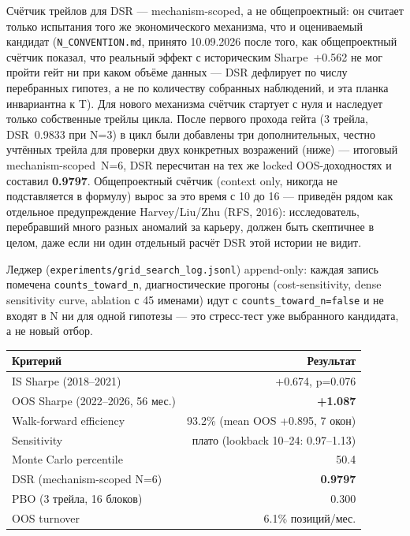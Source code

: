 \documentclass[11pt,a4paper]{article}
\newcommand{\repsection}[1]{\vspace{1.1em}\noindent{\headfont\Large\bfseries\color{accent}#1}\vspace{0.35em}\par}
\newcommand{\repsub}[1]{\vspace{0.7em}\noindent{\headfont\large\bfseries\color{accent}#1}\vspace{0.2em}\par}
\begin{document}
Счётчик трейлов для DSR --- mechanism-scoped, а не общепроектный: он считает только испытания того же экономического механизма, что и оцениваемый кандидат (\texttt{N\_CONVENTION.md}, принято 10.09.2026 после того, как общепроектный счётчик показал, что реальный эффект с историческим Sharpe~+0.562 не мог пройти гейт ни при каком объёме данных --- DSR дефлирует по числу перебранных гипотез, а не по количеству собранных наблюдений, и эта планка инвариантна к T). Для нового механизма счётчик стартует с нуля и наследует только собственные трейлы цикла. После первого прохода гейта (3 трейла, DSR~0.9833 при N=3) в цикл были добавлены три дополнительных, честно учтённых трейла для проверки двух конкретных возражений (ниже) --- итоговый mechanism-scoped~N=6, DSR пересчитан на тех же locked OOS-доходностях и составил \textbf{0.9797}. Общепроектный счётчик (context only, никогда не подставляется в формулу) вырос за это время с 10 до 16 --- приведён рядом как отдельное предупреждение Harvey/Liu/Zhu (RFS, 2016): исследователь, перебравший много разных аномалий за карьеру, должен быть скептичнее в целом, даже если ни один отдельный расчёт DSR этой истории не видит.

Леджер (\texttt{experiments/grid\_search\_log.jsonl}) append-only: каждая запись помечена \texttt{counts\_toward\_n}, диагностические прогоны (cost-sensitivity, dense sensitivity curve, ablation с 45 именами) идут с \texttt{counts\_toward\_n=false} и не входят в N ни для одной гипотезы --- это стресс-тест уже выбранного кандидата, а не новый отбор.

\repsection{Результаты}

\repsub{Гейт}

\begin{center}
\small
\begin{tabular}{lr}
\toprule
Критерий & Результат \\
\midrule
IS Sharpe (2018--2021) & +0.674, p=0.076 \\
OOS Sharpe (2022--2026, 56 мес.) & \textbf{+1.087} \\
Walk-forward efficiency & 93.2\% (mean OOS +0.895, 7 окон) \\
Sensitivity & плато (lookback 10--24: 0.97--1.13) \\
Monte Carlo percentile & 50.4 \\
DSR (mechanism-scoped N=6) & \textbf{0.9797} \\
PBO (3 трейла, 16 блоков) & 0.300 \\
OOS turnover & 6.1\% позиций/мес. \\
\bottomrule
\end{tabular}
\end{center}
\end{document}
